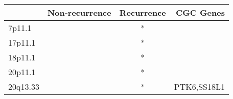 \begin{tabular}{lccr}
\toprule
{} & Non-recurrence & Recurrence &    CGC Genes \\
\midrule
7p11.1   &                &          * &              \\
17p11.1  &                &          * &              \\
18p11.1  &                &          * &              \\
20p11.1  &                &          * &              \\
20q13.33 &                &          * &  PTK6,SS18L1 \\
\bottomrule
\end{tabular}
